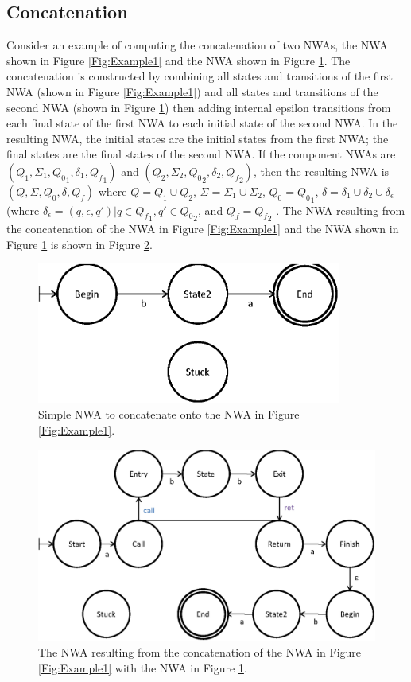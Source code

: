 \documentclass{llncs}
\begin{document}
\subsection{Concatenation}
\label{Se:Concatenation}

Consider an example of computing the concatenation of two NWAs, the NWA shown in Figure \ref{Fig:Example1} and the NWA shown in Figure \ref{Fig:Concat1}.  The concatenation is constructed by combining all states and transitions of the first NWA (shown in Figure \ref{Fig:Example1}) and all states and transitions of the second NWA (shown in Figure \ref{Fig:Concat1}) then adding internal epsilon transitions from each final state of the first NWA to each initial state of the second NWA.  In the resulting NWA, the initial states are the initial states from the first NWA; the final states are the final states of the second NWA.  If the component NWAs are  $(Q_1, \Sigma_1, {Q_0}_1, \delta_1, {Q_f}_1)$ and $(Q_2, \Sigma_2, {Q_0}_2, \delta_2, {Q_f}_2)$, then the resulting NWA is $(Q, \Sigma, Q_0, \delta, Q_f)$ where $Q = Q_1 \cup Q_2$, $\Sigma = \Sigma_1 \cup \Sigma_2$, $Q_0 = {Q_0}_1$, $\delta = \delta_1 \cup \delta_2 \cup \delta_\epsilon$ (where $\delta_\epsilon = {(q,\epsilon,q') | q \in {Q_f}_1, q' \in {Q_0}_2}$, and $Q_f = {Q_f}_2$ .  The NWA resulting from the concatenation of the NWA in Figure \ref{Fig:Example1} and the NWA shown in Figure \ref{Fig:Concat1} is shown in Figure \ref{Fig:Concat2}.

\begin{figure}[htbp]
  \centering
    \includegraphics[width=10cm]{Figures/Figure9.eps}
  \caption{Simple NWA to concatenate onto the NWA in Figure \ref{Fig:Example1}.}
  \label{Fig:Concat1}
\end{figure}

\begin{figure}[htbp]
  \centering
    \includegraphics[width=12cm]{Figures/Figure10.eps}
  \caption{The NWA resulting from the concatenation of the NWA in Figure \ref{Fig:Example1} with the NWA in Figure \ref{Fig:Concat1}.}
  \label{Fig:Concat2}
\end{figure}
\end{document}

